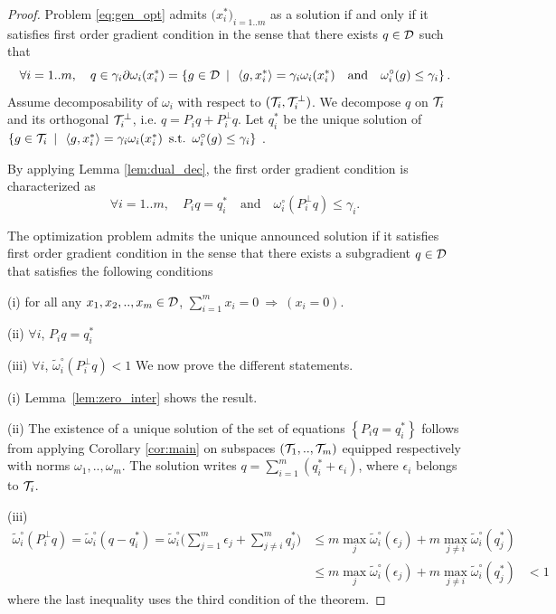 \documentclass{article}
\begin{document}
\begin{proof}

Problem \eqref{eq:gen_opt} admits $\big(x_{i}^*\big)_{i=1..m}$ as a solution if and only if it satisfies first order gradient condition in the sense that there exists $q\in\mathcal{D}$ such that
$$
\forall{i}=1..m, \quad q\in\gamma_{i}\partial\omega_{i}(x_i^*)=\left\lbrace g\in\mathcal{D}  \enspace|\enspace \left\langle g,x_i^* \right\rangle = \gamma_i\omega_{i}(x_i^*) \quad \text{and} \quad \omega_{i}^{\circ}(g)\leq \gamma_i  \right\rbrace.
$$
Assume decomposability of $\omega_i$ with respect to $(\mathcal{T}_i,\mathcal{T}_i^{\perp})$. We decompose $q$ on  $\mathcal{T}_i$ and its orthogonal $\mathcal{T}_i^{\perp}$, i.e. $q=P_i q+P_i^{\perp} q$. 
Let $q_i^*$ be the unique solution of $\left\lbrace g \in \mathcal{T}_i \enspace|\enspace \left\langle g,x_i^* \right\rangle = \gamma_i\omega_{i}(x_i^*) \enspace\text{s.t.}\enspace  \omega_{i}^{\circ}(g)\leq \gamma_i\right\rbrace$ . 

By applying Lemma \ref{lem:dual_dec}, the first order gradient condition is characterized as 
$$
\forall{i}=1..m, \quad P_i q=q_i^* \quad \text{and} \quad \omega_i^\circ(P_i^{\perp} q)\leq \gamma_i.
$$

 The optimization problem admits the unique announced solution if it satisfies first order gradient condition in the sense that there exists a subgradient $q \in \mathcal{D}$ that satisfies the following conditions
\BET
\item[(i)] for all any $x_{1},x_{2},..,x_{m}\in \mathcal{D}$, $\sum_{i=1}^{m} x_{i}=0 \: \Rightarrow \: (x_{i}=0)$.  
\item[(ii)] $\forall i$, $P_i q = q_i^*$
\item[(iii)]$\forall i$, $\widetilde{\omega}_{i}^{\circ}(P_i^{\perp} q)<1$
\EET
We now prove the different statements. 
\BET
\item[(i)]  Lemma~\ref{lem:zero_inter} shows the result. 
\item[(ii)]  The existence of a unique solution of the set of equations $\left\lbrace P_i q = q_i^* \right\rbrace$ follows from applying Corollary \ref{cor:main} on subspaces $\left(\mathcal{T}_1,..,\mathcal{T}_m\right)$ equipped respectively with norms $\omega_1,.., \omega_m$. The solution writes $q=\sum_{i=1}^m(q_i^*+\epsilon_i)$, where $\epsilon_i$ belongs to $\mathcal{T}_i$.
\item[(iii)]  
\begin{align*}
\widetilde{\omega}_{i}^{\circ}(P_i^{\perp} q) = \widetilde{\omega}_{i}^{\circ}(q-q_i^*) = \widetilde{\omega}_{i}^{\circ}\big(\sum_{j=1}^m\epsilon_j + \sum_{j\neq i}^m q_j^*\big) 
&\leq m \max_j \widetilde{\omega}_{i}^{\circ}(\epsilon_j) + m  \max_{j\neq i} \widetilde{\omega}_{i}^{\circ}(q_j^*) \\
&\leq m \max_j \widetilde{\omega}_{i}^{\circ}(\epsilon_j) + m  \max_{j\neq i} \widetilde{\omega}_{i}^{\circ}(q_j^*)
& < 1 
\end{align*}
where the last inequality uses the third condition of the theorem.
\EET
\end{proof}
\end{document}
